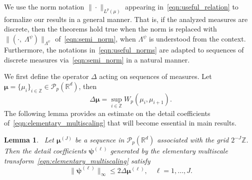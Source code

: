 \documentclass[12pt]{amsart}
\newtheorem{lemma}[theorem]{Lemma}
\begin{document}
We use the norm notation $\|\cdot\|_{L^p(\mu)}$ appearing in~\eqref{eqn:useful_relation} to formalize our results in a general manner. That is, if the analyzed measures are discrete, then the theorems hold true when the norm is replaced with $\|(\cdot, \;\Lambda^\psi)\|_{\Lambda^\psi}$ of~\eqref{eqn:semi_norm}, when $\Lambda^\psi$ is understood from the context. Furthermore, the notations in~\eqref{eqn:useful_norms} are adapted to sequences of discrete measures via~\eqref{eqn:semi_norm} in a natural manner.

We first define the operator $\Delta$ acting on sequences of measures. Let $\boldsymbol{\mu}=\{\mu_i\}_{i\in\mathbb{Z}}\in\mathcal{P}_p(\mathbb{R}^d)$, then
\begin{equation}~\label{eqn:Delta}
    \Delta\boldsymbol{\mu} = \sup_{i\in\mathbb{Z}}W_p(\mu_i, \mu_{i+1}).
\end{equation}
The following lemma provides an estimate on the detail coefficients of~\eqref{eqn:elementary_multiscaling} that will become essential in main results.

\begin{lemma}~\label{lem:details_delta_bound}
     Let $\boldsymbol{\mu}^{(J)}$ be a sequence in $\mathcal{P}_p(\mathbb{R}^d)$ associated with the grid $2^{-J}\mathbb{Z}$. Then the detail coefficients $\boldsymbol{\psi}^{(\ell)}$ generated by the elementary multiscale transform~\eqref{eqn:elementary_multiscaling} satisfy
     \begin{equation}~\label{eqn:details_delta_bound}
         \|\boldsymbol{\psi}^{(\ell)}\|_{\infty} \leq 2\Delta \boldsymbol{\mu}^{(\ell)}, \quad \ell=1,\dots,J.
     \end{equation}
\end{lemma}
\end{document}
